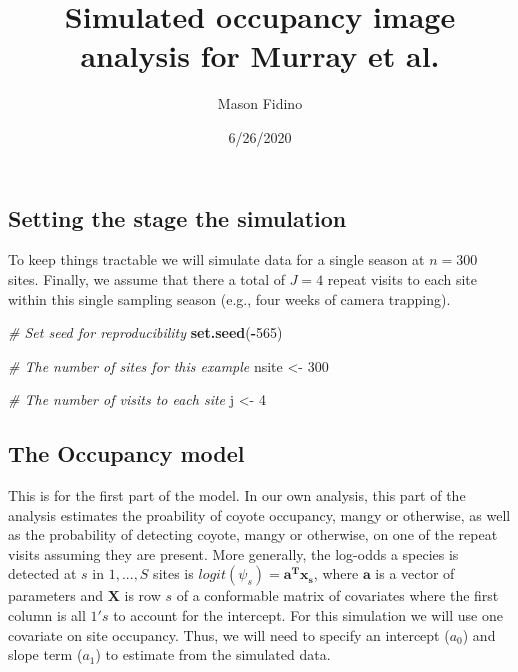\documentclass[
]{article}
\title{Simulated occupancy image analysis for Murray et al.}
\author{Mason Fidino}
\date{6/26/2020}
\newenvironment{Shaded}{\begin{snugshade}}{\end{snugshade}}
\newcommand{\CommentTok}[1]{\textcolor[rgb]{0.56,0.35,0.01}{\textit{#1}}}
\newcommand{\DecValTok}[1]{\textcolor[rgb]{0.00,0.00,0.81}{#1}}
\newcommand{\KeywordTok}[1]{\textcolor[rgb]{0.13,0.29,0.53}{\textbf{#1}}}
\newcommand{\NormalTok}[1]{#1}
\newcommand{\OperatorTok}[1]{\textcolor[rgb]{0.81,0.36,0.00}{\textbf{#1}}}
\newcommand{\StringTok}[1]{\textcolor[rgb]{0.31,0.60,0.02}{#1}}
\begin{document}
\maketitle

\hypertarget{setting-the-stage-the-simulation}{%
\subsection{Setting the stage the
simulation}\label{setting-the-stage-the-simulation}}

To keep things tractable we will simulate data for a single season at
\(n = 300\) sites. Finally, we assume that there a total of \(J = 4\)
repeat visits to each site within this single sampling season (e.g.,
four weeks of camera trapping).\\

\begin{Shaded}
\begin{Highlighting}[]
\CommentTok{# Set seed for reproducibility}
\KeywordTok{set.seed}\NormalTok{(}\OperatorTok{-}\DecValTok{565}\NormalTok{)}

\CommentTok{# The number of sites for this example}
\NormalTok{nsite <-}\StringTok{ }\DecValTok{300}

\CommentTok{# The number of visits to each site}
\NormalTok{j <-}\StringTok{ }\DecValTok{4}
\end{Highlighting}
\end{Shaded}

\hypertarget{the-occupancy-model}{%
\subsection{The Occupancy model}\label{the-occupancy-model}}

This is for the first part of the model. In our own analysis, this part
of the analysis estimates the proability of coyote occupancy, mangy or
otherwise, as well as the probability of detecting coyote, mangy or
otherwise, on one of the repeat visits assuming they are present. More
generally, the log-odds a species is detected at \(s\) in \(1,...,S\)
sites is \(logit(\psi_s) = \bm{a^T x_s}\), where \(\bm{a}\) is a vector
of parameters and \(\bm{X}\) is row \(s\) of a conformable matrix of
covariates where the first column is all \(1's\) to account for the
intercept. For this simulation we will use one covariate on site
occupancy. Thus, we will need to specify an intercept (\(a_0\)) and
slope term (\(a_1\)) to estimate from the simulated data.
\end{document}
